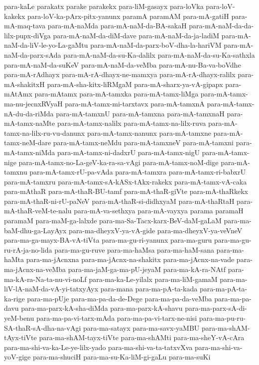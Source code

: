 {para-kaLe
parakatx
parake
parakekx
para-liM-gasayx
para-loVka
para-loV-kakekx
para-loV-ka-pArx-pitx-yanunx
paramA
paramAM
para-mA-gatiH
para-mA-maq-tava
para-mA-naMda
para-mA-naM-da-BA-sakaH
para-mA-naM-da-da-lilx-pupx-diVga
para-mA-naM-da-diM-dave
para-mA-naM-da-ja-ladiM
para-mA-naM-da-liV-le-yo-La-gaMtu
para-mA-naM-da-parx-boV-dha-la-hariVM
para-mA-naM-da-parx-sAda
para-mA-naM-da-su-Ka-dalilx
para-mA-naM-da-su-Ka-sathxla
para-mA-naM-da-suKeV
para-mA-naM-da-veMba
para-mA-nu-Ba-va-boVdhe
para-mA-rAdhayx
para-mA-rA-dhayx-ne-mamxya
para-mA-rA-dhayx-ralilx
para-mA-shakitxH
para-mA-sha-kitx-liRMgaM
para-mA-sharx-ya-vA-gipapx
para-mAtAmx
para-mAtamx
para-mA-tamxka
para-mA-tamx-liMga
para-mA-tamx-ma-nu-jecnxRVyaH
para-mA-tamx-mi-tarxtavx
para-mA-tamxnA
para-mA-tamx-nA-du-da-riMda
para-mA-tamxnU
para-mA-tamxna
para-mA-tamxnaH
para-mA-tamx-naMte
para-mA-tamx-nalilx
para-mA-tamx-na-lilx-ruva
para-mA-tamx-na-lilx-ru-vu-danunx
para-mA-tamx-nanunx
para-mA-tamxne
para-mA-tamx-neM-dare
para-mA-tamx-neMdu
para-mA-tamxneV
para-mA-tamxni
para-mA-tamx-niMda
para-mA-tamx-ni-dadxrU
para-mA-tamx-nigU
para-mA-tamx-nige
para-mA-tamx-no-La-geV-ka-ra-sa-vAgi
para-mA-tamx-noM-dige
para-mA-tamxnu
para-mA-tamx-rU-pa-vAda
para-mA-tamxra
para-mA-tamx-ri-babxrU
para-mA-tamxru
para-mA-tamx-sA-kASx-tAkx-rakekx
para-mA-tamx-vA-caka
para-mAthaR
para-mA-thaR-BU-tamf
para-mA-thaR-giVte
para-mA-thaRkekx
para-mA-thaR-ni-rU-paNeV
para-mA-thaR-si-didhxyaM
para-mA-thaRtaH
para-mA-thaR-veM-te-nalu
para-mA-va-sethxya
para-mA-vayxya
parama
paramaH
paramaM
para-maM-ga-lalxde
para-ma-Sa-Tacx-karx-BeV-daM-gaLaM
para-ma-baM-dhu-ga-LayAyx
para-ma-dheyxV-ya-vA-gide
para-ma-dheyxV-ya-veVneV
para-ma-ga-mayx-BA-vA-tiVta
para-ma-gu-ri-yanunx
para-ma-guru
para-ma-gu-ru-rA-ja-no-lida
para-ma-gu-ruve
para-ma-haMsa
para-ma-haM-sana
para-ma-haMta
para-ma-jAcnxna
para-ma-jAcnx-na-shakitx
para-ma-jAcnx-na-vade
para-ma-jAcnx-na-veMba
para-ma-jaM-ga-ma-pU-jeyaM
para-ma-kA-ra-NAtf
para-ma-kA-ra-Na-ta-nu-vi-noLf
para-ma-ka-Le-yilalx
para-ma-liM-gamaM
para-ma-liV-lA-naM-da-vA-yi-tatxyAyx
para-mana
para-ma-pA-ta-kada
para-ma-pA-ta-ka-rige
para-ma-pUje
para-ma-pa-da-de-Dege
para-ma-pa-da-veMba
para-ma-pa-davu
para-ma-parx-kA-sha-diMda
para-ma-parx-kA-shavu
para-ma-parx-sA-di-yeM-benu
para-ma-pa-vi-tarx-mAda
para-ma-pa-vi-tarx-ne-nisi
para-ma-pu-ru-SA-thaR-sA-dha-na-vAgi
para-ma-satayx
para-ma-savx-yaMBU
para-ma-shAM-tAyx-tiVte
para-ma-shAM-tayx-tiVte
para-ma-shAMti
para-ma-sheY-vA-cAra
para-ma-shi-va-ka-Le-ye-lilx-yado
para-ma-shi-va-ta-tatxvXva
para-ma-shi-va-yoV-gige
para-ma-shuciH
para-ma-su-Ka-liM-gi-gaLu
para-ma-suKi
}

